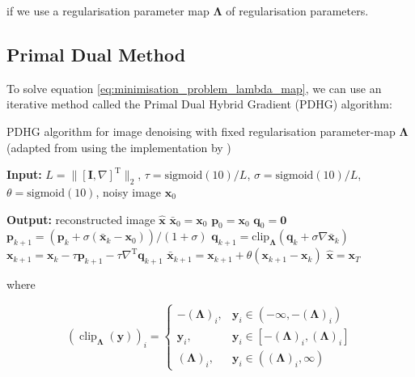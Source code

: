 \documentclass[12pt]{article}
\begin{document}
if we use a regularisation parameter map $\mathbf{\Lambda}$ of regularisation parameters.




\subsection{Primal Dual Method}

To solve equation \ref{eq:minimisation_problem_lambda_map},
we can use an iterative method called the Primal Dual Hybrid Gradient (PDHG) algorithm: 

\begin{algorithm}[H]
\caption{PDHG algorithm for image denoising with fixed regularisation parameter-map $\boldsymbol{\Lambda}$ (adapted from \cite{kofler2023learning} using the implementation by \cite{dyn_img_pdhg_code})}
\begin{algorithmic}[1]

\STATE \textbf{Input:} 
$L = \| [\mathbf{I}, \nabla]^\text{T} \|_2$, 
$\tau = \text{sigmoid}(10) / L$, 
$\sigma = \text{sigmoid}(10) / L$, 
$\theta = \text{sigmoid}(10)$, 
noisy image $\mathbf{x}_0$

\STATE \textbf{Output:} reconstructed image $\hat{\mathbf{x}}$
\STATE $\bar{\mathbf{x}}_0 = \mathbf{x}_0$
\STATE $\mathbf{p}_0 = \mathbf{x}_0$
\STATE $\mathbf{q}_0 = \mathbf{0}$
    \STATE $\mathbf{p}_{k+1} = \left(\mathbf{p}_k + \sigma ( \bar{\mathbf{x}}_k - \mathbf{x}_0)\right) / (1 + \sigma)$
    \STATE $\mathbf{q}_{k+1} = \text{clip}_{\boldsymbol{\Lambda}} \left(\mathbf{q}_k + \sigma \nabla \bar{\mathbf{x}}_k \right)$
    \STATE $\mathbf{x}_{k+1} = \mathbf{x}_k - \tau \mathbf{p}_{k+1} - \tau \nabla^\text{T} \mathbf{q}_{k+1}$
    \STATE $\bar{\mathbf{x}}_{k+1} = \mathbf{x}_{k+1} + \theta (\mathbf{x}_{k+1} - \mathbf{x}_k)$
\ENDFOR
\STATE $\hat{\mathbf{x}} = \mathbf{x}_T$
\end{algorithmic}
\end{algorithm}

where 

\begin{equation}
    \left( \operatorname{clip}_{\bm{\Lambda}}(\bm{y}) \right)_i =
    \begin{cases}
    -(\bm{\Lambda})_i, & \bm{y}_i \in (-\infty, -(\bm{\Lambda})_i) \\
    \bm{y}_i, & \bm{y}_i \in \left[ -(\bm{\Lambda})_i, (\bm{\Lambda})_i \right] \\
    (\bm{\Lambda})_i, & \bm{y}_i \in ((\bm{\Lambda})_i, \infty)
    \end{cases}
\end{equation}
\end{document}
